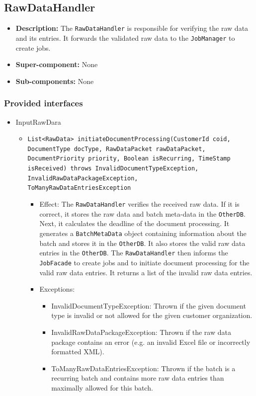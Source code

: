 \documentclass[a4paper,10pt]{article}
\begin{document}
\subsection{RawDataHandler}
\begin{itemize}
    \item \textbf{Description:} The \texttt{RawDataHandler} is responsible for verifying the raw data and its entries. It forwards the validated raw data to the \texttt{JobManager} to create jobs.
    \item \textbf{Super-component:} None
    \item \textbf{Sub-components:} None
\end{itemize}

\subsubsection*{Provided interfaces}
\begin{itemize}
    \item InputRawDara
    \begin{itemize}
        \item \texttt{List<RawData> initiateDocumentProcessing(CustomerId coid, DocumentType docType, RawDataPacket rawDataPacket, DocumentPriority priority, Boolean isRecurring, TimeStamp isReceived) throws InvalidDocumentTypeException, InvalidRawDataPackageException,\\ ToManyRawDataEntriesException}
        \begin{itemize}
            \item Effect: The \texttt{RawDataHandler} verifies the received raw data. If it is correct, it stores the raw data and batch meta-data in the \texttt{OtherDB}. Next, it calculates the deadline of the document processing. It generates a \texttt{BatchMetaData} object containing information about the batch and stores it in the \texttt{OtherDB}. It also stores the valid raw data entries in the \texttt{OtherDB}. The \texttt{RawDataHandler} then informs the \texttt{JobFacade} to create jobs and to initiate document processing for the valid raw data entries. It returns a list of the invalid raw data entries.
            \item Exceptions:
            \begin{itemize}
                \item InvalidDocumentTypeException: Thrown if the given document type is invalid or not allowed for the given customer organization.
            	\item InvalidRawDataPackageException: Thrown if the raw data package contains an error (e.g. an invalid Excel file or incorrectly formatted XML).
            	\item ToManyRawDataEntriesException: Thrown if the batch is a recurring batch and contains more raw data entries than maximally allowed for this batch.
            \end{itemize}
        \end{itemize}
    \end{itemize} 
\end{itemize}
\end{document}
